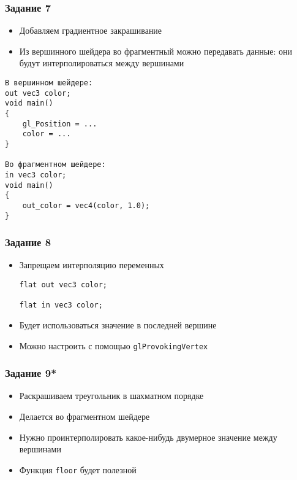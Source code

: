 \documentclass{beamer}
\begin{document}
\begin{frame}[fragile]
\frametitle{Задание 7}
\begin{itemize}
\item Добавляем градиентное закрашивание
\item Из вершинного шейдера во фрагментный можно передавать данные: они будут интерполироваться между вершинами
\end{itemize}
\pause
\begin{verbatim}
В вершинном шейдере:
out vec3 color;
void main()
{
    gl_Position = ...
    color = ...
}

Во фрагментном шейдере:
in vec3 color;
void main()
{
    out_color = vec4(color, 1.0);
}
\end{verbatim}
\end{frame}

\begin{frame}[fragile]
\frametitle{Задание 8}
\begin{itemize}
\item Запрещаем интерполяцию переменных
\pause
\begin{verbatim}
flat out vec3 color;

flat in vec3 color;
\end{verbatim}
\pause
\item Будет использоваться значение в последней вершине
\item Можно настроить с помощью \verb|glProvokingVertex|
\end{itemize}
\end{frame}

\begin{frame}[fragile]
\frametitle{Задание 9*}
\begin{itemize}
\item Раскрашиваем треугольник в шахматном порядке
\pause
\item Делается во фрагментном шейдере
\pause
\item Нужно проинтерполировать какое-нибудь двумерное значение между вершинами
\pause
\item Функция \verb|floor| будет полезной
\end{itemize}
\end{frame}
\end{document}
